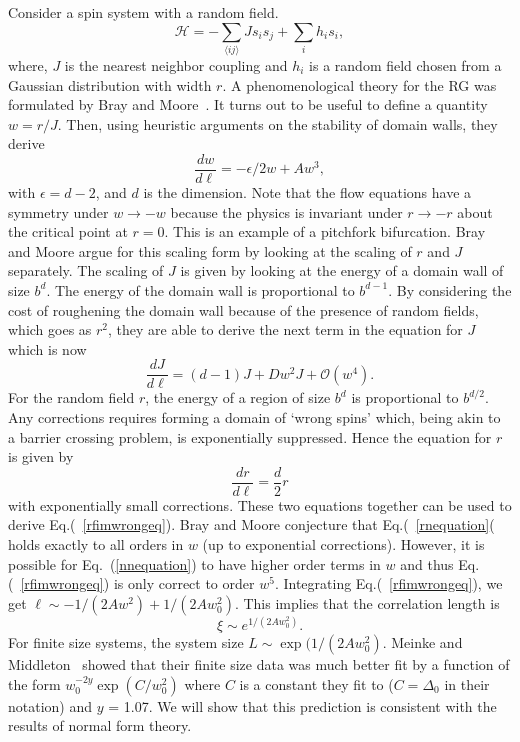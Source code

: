 \documentclass[
 reprint,
 amsmath,amssymb,
 aps, superscriptaddress, pre
]{revtex4-1}
\begin{document}
Consider a spin system with a random field.  
\begin{equation}
 \mathcal{H} = -\sum_{\langle i j \rangle} J s_i s_j + \sum_i h_i s_i ,
\end{equation}
where, $J$ is the nearest neighbor coupling and $h_i$ is a random field chosen from a Gaussian distribution with width $r$. A phenomenological theory for the RG was formulated by Bray and Moore~\cite{Bray85}. It turns out to be useful to define a quantity $w = r/J$. Then, using heuristic arguments on the stability of domain walls, they derive
\begin{equation}
 \frac{d w}{d \ell} = -\epsilon/2 w + A w^3 ,
 \label{rfimwrongeq}
\end{equation}
with $\epsilon = d-2$, and $d$ is the dimension. Note that the flow equations have a symmetry under $w \rightarrow -w$ because the physics is invariant under $r \rightarrow -r$ about the critical point at $r = 0$. This is an example of a pitchfork bifurcation. Bray and Moore argue for this scaling form by looking at the scaling of $r$ and $J$ separately. The scaling of $J$ is given by looking at the energy of a domain wall of size $b^d$. The energy of the domain wall is proportional to $b^{d-1}$. By considering the cost of roughening the domain wall because of the presence of random fields, which goes as $r^2$, they are able to derive the next term in the equation for $J$ which is now
\begin{equation}
 \frac{d J}{d \ell} = (d - 1) J + D w^2 J + \mathcal{O}(w^4) .
 \label{nnequation}
\end{equation}
For the random field $r$, the energy of a region of size $b^d$ is proportional to $b^{d/2}$. Any corrections requires forming a domain of `wrong spins' which, being akin to a barrier crossing problem, is exponentially suppressed. Hence the equation for $r$ is given by 
\begin{equation}
\frac{d r}{d \ell} = \frac{d}{2} r 
\label{rnequation}
\end{equation}
with exponentially small corrections. These two equations together can be used to derive Eq.(~\ref{rfimwrongeq}). Bray and Moore conjecture that Eq.(~\ref{rnequation}( holds exactly to all orders in $w$ (up to exponential corrections). However, it is possible for Eq.~(\ref{nnequation}) to have higher order terms in $w$ and thus Eq.(~\ref{rfimwrongeq}) is only correct to order $w^5$. Integrating Eq.(~\ref{rfimwrongeq}), we get $\ell \sim -1/(2 A w^2) + 1/(2 A w_0^2)$. This implies that the correlation length is 
\begin{equation}
 \xi \sim e^{1/(2 A w_0^2)} .
\end{equation}
For finite size systems, the system size $L \sim \exp(1/(2 A w_0^2)$. Meinke and Middleton~\cite{Meinke05} showed that their finite size data was much better fit by a function of the form $w_0^{-2 y} \exp(C/w_0^2)$ where $C$ is a constant they fit to ($C=\Delta_0$ in their notation) and $y$ = 1.07. We will show that this prediction is consistent with the results of normal form theory. 
\end{document}
